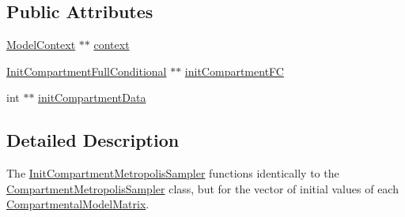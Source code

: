 \subsection*{Public Attributes}
\begin{DoxyCompactItemize}
\item 
\hyperlink{classSpatialSEIR_1_1ModelContext}{Model\-Context} $\ast$$\ast$ \hyperlink{classSpatialSEIR_1_1InitCompartmentMetropolisSampler_a3d6e255eb92808635a3b3cf869f136d8}{context}
\item 
\hyperlink{classSpatialSEIR_1_1InitCompartmentFullConditional}{Init\-Compartment\-Full\-Conditional} $\ast$$\ast$ \hyperlink{classSpatialSEIR_1_1InitCompartmentMetropolisSampler_af03f0584b11639e8fbe907307ad28aa4}{init\-Compartment\-F\-C}
\item 
int $\ast$$\ast$ \hyperlink{classSpatialSEIR_1_1InitCompartmentMetropolisSampler_ade210e4e15fddcfac80ce9c6c263e289}{init\-Compartment\-Data}
\end{DoxyCompactItemize}


\subsection{Detailed Description}
The \hyperlink{classSpatialSEIR_1_1InitCompartmentMetropolisSampler}{Init\-Compartment\-Metropolis\-Sampler} functions identically to the \hyperlink{classSpatialSEIR_1_1CompartmentMetropolisSampler}{Compartment\-Metropolis\-Sampler} class, but for the vector of initial values of each \hyperlink{classSpatialSEIR_1_1CompartmentalModelMatrix}{Compartmental\-Model\-Matrix}. 

